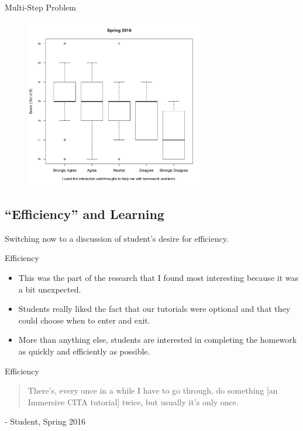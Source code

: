 \documentclass[xcolor=x11names,compress]{beamer}
\begin{document}
\begin{frame}{Multi-Step Problem}
	\begin{figure}
		\includegraphics[width=0.7\textwidth]{img/multi-step_vs_reported_use.pdf}
	\end{figure}
\end{frame}

\subsection{``Efficiency'' and Learning}

\begin{frame}
	\begin{center}
		{\large Switching now to a discussion of student's desire for efficiency.}
	\end{center}
\end{frame}

\begin{frame}{Efficiency}
	\begin{itemize}
		\item This was the part of the research that I found most interesting because it was a bit unexpected.
		\item Students really liked the fact that our tutorials were optional and that they could choose when to enter and exit.
		\item More than anything else, students are interested in completing the homework as quickly and efficiently as possible.
	\end{itemize}
\end{frame}

\begin{frame}{Efficiency}
	\begin{quote}
		There's, every once in a while I have to go through, do something [an Immersive CITA tutorial] twice, but usually it's only once.
	\end{quote}
	\vspace{5mm}
	- Student, Spring 2016
\end{frame}
\end{document}
